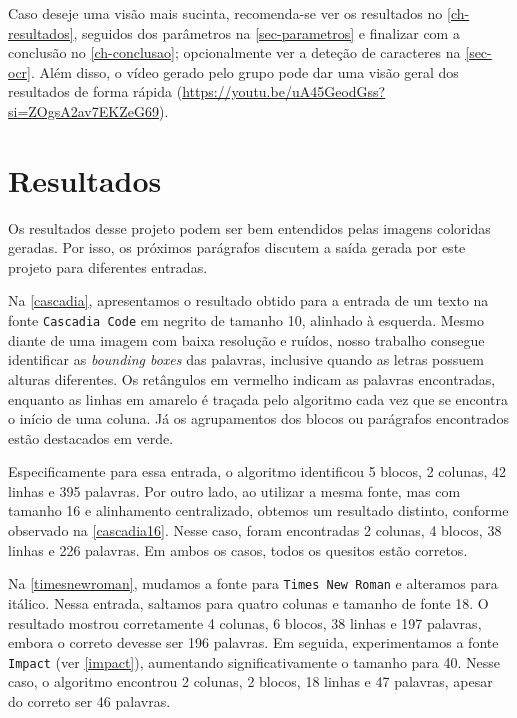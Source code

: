 \documentclass[english, 
               brazil, 
               bsc] %
               {dcomp-abntex2}
\begin{document}
Caso deseje uma visão mais sucinta, recomenda-se ver os resultados no \autoref{ch-resultados}, seguidos dos parâmetros na \autoref{sec-parametros} e finalizar com a conclusão no \autoref{ch-conclusao}; opcionalmente ver a deteção de caracteres na \autoref{sec-ocr}. Além disso, o vídeo gerado pelo grupo pode dar uma visão geral dos resultados de forma rápida (\url{https://youtu.be/uA45GeodGss?si=ZOgsA2av7EKZeG69}).




\chapter{Resultados} \label{ch-resultados}
Os resultados desse projeto podem ser bem entendidos pelas imagens coloridas geradas. Por isso, os próximos parágrafos discutem a saída gerada por este projeto para diferentes entradas.


Na \autoref{cascadia}, apresentamos o resultado obtido para a entrada de um texto na fonte \texttt{Cascadia Code} em negrito de tamanho 10, alinhado à esquerda. Mesmo diante de uma imagem com baixa resolução e ruídos, nosso trabalho consegue identificar as \textit{bounding boxes} das palavras, inclusive quando as letras possuem alturas diferentes. Os retângulos em vermelho indicam as palavras encontradas, enquanto as linhas em amarelo é traçada pelo algoritmo cada vez que se encontra o início de uma coluna. Já os agrupamentos dos blocos ou parágrafos encontrados estão destacados em verde.


Especificamente para essa entrada, o algoritmo identificou 5 blocos, 2 colunas, 42 linhas e 395 palavras. Por outro lado, ao utilizar a mesma fonte, mas com tamanho 16 e alinhamento centralizado, obtemos um resultado distinto, conforme observado na \autoref{cascadia16}. Nesse caso, foram encontradas 2 colunas, 4 blocos, 38 linhas e 226 palavras. Em ambos os casos, todos os quesitos estão corretos.



Na \autoref{timesnewroman}, mudamos a fonte para \texttt{Times New Roman} e alteramos para itálico. Nessa entrada, saltamos para quatro colunas e tamanho de fonte 18. O resultado mostrou corretamente 4 colunas, 6 blocos, 38 linhas e 197 palavras, embora o correto devesse ser 196 palavras. Em seguida, experimentamos a fonte \texttt{Impact} (ver \autoref{impact}), aumentando significativamente o tamanho para 40. Nesse caso, o algoritmo encontrou 2 colunas, 2 blocos, 18 linhas e 47 palavras, apesar do correto ser 46 palavras.
\end{document}
